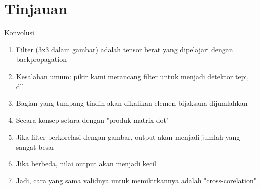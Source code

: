 \chapter{Tinjauan}
Konvolusi
\begin{enumerate}
\item Filter (3x3 dalam gambar) adalah tensor berat yang dipelajari dengan backpropagation
\item Kesalahan umum: pikir kami merancang filter untuk menjadi detektor tepi, dll
\item Bagian yang tumpang tindih akan dikalikan elemen-bijaksana dijumlahkan
\item Secara konsep setara dengan "produk matrix dot"
\item Jika filter berkorelasi dengan gambar, output akan menjadi jumlah yang sangat besar
\item Jika berbeda, nilai output akan menjadi kecil
\item Jadi, cara yang sama validnya untuk memikirkannya adalah "cross-corelation"
\end{enumerate}